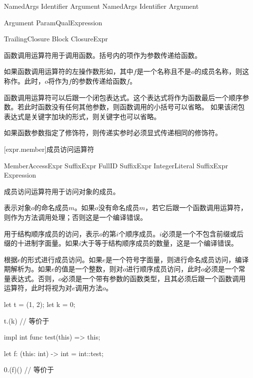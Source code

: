 \begin{bnf}{NamedArgs}
    Identifier \terminal{:} Argument \br
    NamedArgs \terminal{,} Identifier \terminal{:} Argument
\end{bnf}

\begin{bnf}{Argument}
    ParamQual\bnfq Expression
\end{bnf}

\begin{bnf}{TrailingClosure}
    Block \br
    ClosureExpr
\end{bnf}

\pnum
函数调用运算符用于调用函数。括号内的项作为参数传递给函数。

\pnum
如果函数调用运算符的左操作数形如，其中$f$是一个名称且不是$o$的成员名称，则这称作。此时，$o$将作为$f$的参数传递给函数$f$。

\pnum
函数调用运算符可以后跟一个闭包表达式。这个表达式将作为函数最后一个顺序参数。若此时函数没有任何其他参数，则函数调用的小括号可以省略。
如果该闭包表达式是关键字加块的形式，则关键字也可以省略。

\pnum
如果函数参数指定了修饰符，则传递实参时必须显式传递相同的修饰符。

[expr.member]{成员访问运算符}

\begin{bnf}{MemberAccessExpr}
    SuffixExpr  FullID \br
    SuffixExpr  IntegerLiteral \br
    SuffixExpr  \terminal{(} Expression \terminal{)}
\end{bnf}

\pnum
成员访问运算符用于访问对象的成员。

\pnum
{}表示对象$o$的命名成员$m$。如果$o$没有命名成员$m$，若它后跟一个函数调用运算符，则作为方法调用处理；否则这是一个编译错误。

\pnum
{}用于结构顺序成员的访问，表示$o$的第$i$个顺序成员。$i$必须是一个不包含前缀或后缀的十进制字面量。如果$i$大于等于结构顺序成员的数量，这是一个编译错误。

\pnum
{}根据$e$的形式进行成员访问。如果$e$是一个符号字面量，则进行命名成员访问，编译期解析为。如果$e$的值是一个整数，则对$o$进行顺序成员访问，此时$o$必须是一个常量表达式。否则，$o$必须是一个带有参数的函数类型，且其必须后跟一个函数调用运算符，此时将视为对$e$调用方法$o$。

\enterexample
\begin{codeblock}
let t = (1, 2);
let k = 0;

t.(k) // 等价于

impl int {
    func test(this) => this;
}

let f: (this: int) -> int = int::test;

0.(f)() // 等价于
\end{codeblock}
\exitexample

